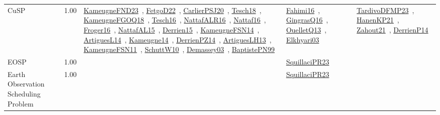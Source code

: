 {\begin{longtable}{p{3cm}r>{\raggedright\arraybackslash}p{6cm}>{\raggedright\arraybackslash}p{6cm}>{\raggedright\arraybackslash}p{8cm}}
\index{CuSP}\index{Classification!CuSP}CuSP &  1.00 & \href{../works/KameugneFND23.pdf}{KameugneFND23}~\cite{KameugneFND23}, \href{../works/FetgoD22.pdf}{FetgoD22}~\cite{FetgoD22}, \href{../works/CarlierPSJ20.pdf}{CarlierPSJ20}~\cite{CarlierPSJ20}, \href{../works/Tesch18.pdf}{Tesch18}~\cite{Tesch18}, \href{../works/KameugneFGOQ18.pdf}{KameugneFGOQ18}~\cite{KameugneFGOQ18}, \href{../works/Tesch16.pdf}{Tesch16}~\cite{Tesch16}, \href{../works/NattafALR16.pdf}{NattafALR16}~\cite{NattafALR16}, \href{../works/Nattaf16.pdf}{Nattaf16}~\cite{Nattaf16}, \href{../works/Froger16.pdf}{Froger16}~\cite{Froger16}, \href{../works/NattafAL15.pdf}{NattafAL15}~\cite{NattafAL15}, \href{../works/Derrien15.pdf}{Derrien15}~\cite{Derrien15}, \href{../works/KameugneFSN14.pdf}{KameugneFSN14}~\cite{KameugneFSN14}, \href{../works/ArtiguesL14.pdf}{ArtiguesL14}~\cite{ArtiguesL14}, \href{../works/Kameugne14.pdf}{Kameugne14}~\cite{Kameugne14}, \href{../works/DerrienPZ14.pdf}{DerrienPZ14}~\cite{DerrienPZ14}, \href{../works/ArtiguesLH13.pdf}{ArtiguesLH13}~\cite{ArtiguesLH13}, \href{../works/KameugneFSN11.pdf}{KameugneFSN11}~\cite{KameugneFSN11}, \href{../works/SchuttW10.pdf}{SchuttW10}~\cite{SchuttW10}, \href{../works/Demassey03.pdf}{Demassey03}~\cite{Demassey03}, \href{../works/BaptistePN99.pdf}{BaptistePN99}~\cite{BaptistePN99} & \href{../works/Fahimi16.pdf}{Fahimi16}~\cite{Fahimi16}, \href{../works/GingrasQ16.pdf}{GingrasQ16}~\cite{GingrasQ16}, \href{../works/OuelletQ13.pdf}{OuelletQ13}~\cite{OuelletQ13}, \href{../works/Elkhyari03.pdf}{Elkhyari03}~\cite{Elkhyari03} & \href{../works/TardivoDFMP23.pdf}{TardivoDFMP23}~\cite{TardivoDFMP23}, \href{../works/HanenKP21.pdf}{HanenKP21}~\cite{HanenKP21}, \href{../works/Zahout21.pdf}{Zahout21}~\cite{Zahout21}, \href{../works/DerrienP14.pdf}{DerrienP14}~\cite{DerrienP14}\\
\index{EOSP}\index{Classification!EOSP}EOSP &  1.00 &  & \href{../works/SquillaciPR23.pdf}{SquillaciPR23}~\cite{SquillaciPR23} & \\
\index{Earth Observation Scheduling Problem}\index{Classification!Earth Observation Scheduling Problem}Earth Observation Scheduling Problem &  1.00 &  & \href{../works/SquillaciPR23.pdf}{SquillaciPR23}~\cite{SquillaciPR23} & \\

\end{longtable}}

